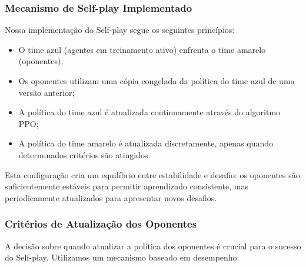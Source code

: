 \subsubsection{Mecanismo de Self-play Implementado}

Nossa implementação do Self-play segue os seguintes princípios:

\begin{itemize}
    \item O time azul (agentes em treinamento ativo) enfrenta o time amarelo (oponentes);
    \item Os oponentes utilizam uma cópia congelada da política do time azul de uma versão anterior;
    \item A política do time azul é atualizada continuamente através do algoritmo PPO;
    \item A política do time amarelo é atualizada discretamente, apenas quando determinados critérios são atingidos.
\end{itemize}

Esta configuração cria um equilíbrio entre estabilidade e desafio: os oponentes são suficientemente estáveis para permitir aprendizado consistente, mas periodicamente atualizados para apresentar novos desafios.

\subsubsection{Critérios de Atualização dos Oponentes}

A decisão sobre quando atualizar a política dos oponentes é crucial para o sucesso do Self-play. Utilizamos um mecanismo baseado em desempenho:


